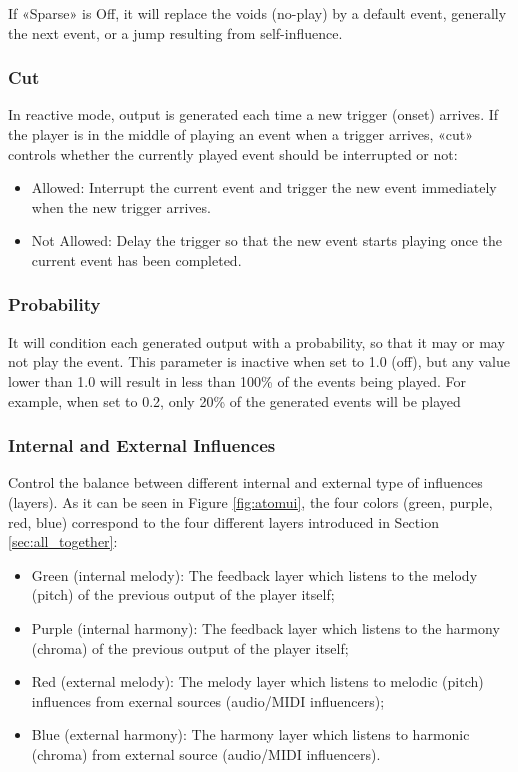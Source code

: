 \noindent If «Sparse» is Off, it will replace the voids (no-play) by a default event, generally the next event, or a jump resulting from self-influence.

\subsubsection{Cut}
In reactive mode, output is generated each time a new trigger (onset) arrives. If the player is in the middle of playing an event when a trigger arrives, «cut» controls whether the currently played event should be interrupted or not:

\begin{itemize}
    \item Allowed: Interrupt the current event and trigger the new event immediately when the new trigger arrives.
    \item Not Allowed: Delay the trigger so that the new event starts playing once the current event has been completed.
\end{itemize}

\subsubsection{Probability}
It will condition each generated output with a probability, so that it may or may not play the event. This parameter is inactive when set to 1.0 (off), but any value lower than 1.0 will result in less than 100\% of the events being played. For example, when set to 0.2, only 20\% of the generated events will be played

\subsubsection{Internal and External Influences}
Control the balance between different internal and external type of influences (layers).
As it can be seen in Figure \ref{fig:atomui}, the four colors (green, purple, red, blue) correspond to the four different layers introduced in Section \ref{sec:all_together}:

\begin{itemize}
    \item Green (internal melody): The feedback layer which listens to the melody (pitch) of the previous output of the player itself;
    \item Purple (internal harmony): The feedback layer which listens to the harmony (chroma) of the previous output of the player itself;
    \item Red (external melody): The melody layer which listens to melodic (pitch) influences from exernal sources (audio/MIDI influencers);
    \item Blue (external harmony): The harmony layer which listens to harmonic (chroma) from external source (audio/MIDI influencers).
\end{itemize}

